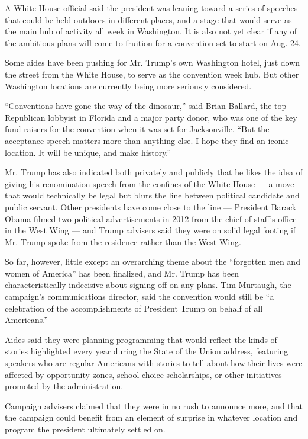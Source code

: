 A White House official said the president was leaning toward a series of
speeches that could be held outdoors in different places, and a stage
that would serve as the main hub of activity all week in Washington. It
is also not yet clear if any of the ambitious plans will come to
fruition for a convention set to start on Aug. 24.

Some aides have been pushing for Mr. Trump's own Washington hotel, just
down the street from the White House, to serve as the convention week
hub. But other Washington locations are currently being more seriously
considered.

``Conventions have gone the way of the dinosaur,'' said Brian Ballard,
the top Republican lobbyist in Florida and a major party donor, who was
one of the key fund-raisers for the convention when it was set for
Jacksonville. ``But the acceptance speech matters more than anything
else. I hope they find an iconic location. It will be unique, and make
history.''

Mr. Trump has also indicated both privately and publicly that he likes
the idea of giving his renomination speech from the confines of the
White House --- a move that would technically be legal but blurs the
line between political candidate and public servant. Other presidents
have come close to the line --- President Barack Obama filmed two
political advertisements in 2012 from the chief of staff's office in the
West Wing --- and Trump advisers said they were on solid legal footing
if Mr. Trump spoke from the residence rather than the West Wing.

So far, however, little except an overarching theme about the
``forgotten men and women of America'' has been finalized, and Mr. Trump
has been characteristically indecisive about signing off on any plans.
Tim Murtaugh, the campaign's communications director, said the
convention would still be ``a celebration of the accomplishments of
President Trump on behalf of all Americans.''

Aides said they were planning programming that would reflect the kinds
of stories highlighted every year during the State of the Union address,
featuring speakers who are regular Americans with stories to tell about
how their lives were affected by opportunity zones, school choice
scholarships, or other initiatives promoted by the administration.

Campaign advisers claimed that they were in no rush to announce more,
and that the campaign could benefit from an element of surprise in
whatever location and program the president ultimately settled on.

